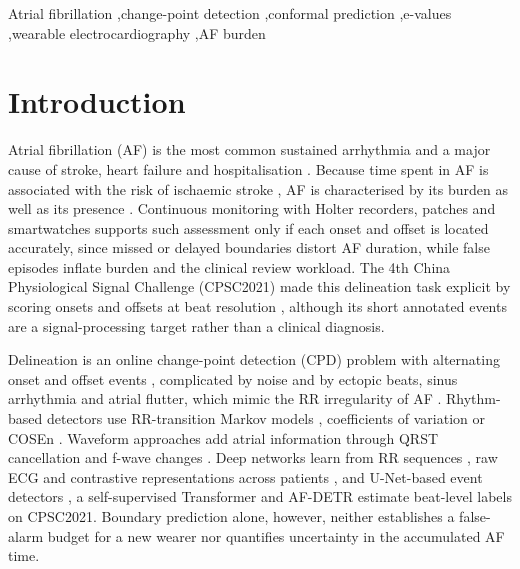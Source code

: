 \documentclass[preprint,12pt]{elsarticle}
\newcommand{\1}{\mathbf{1}}
\begin{document}
\begin{frontmatter}
\begin{keyword}
Atrial fibrillation \sep change-point detection \sep conformal prediction \sep e-values \sep wearable electrocardiography \sep AF burden
\end{keyword}

\end{frontmatter}

\section{Introduction}
\label{sec:intro}

Atrial fibrillation (AF) is the most common sustained arrhythmia and a major cause of stroke, heart failure and hospitalisation \cite{vangelder2024esc}. Because time spent in AF is associated with the risk of ischaemic stroke \cite{becher2024burden}, AF is characterised by its burden as well as its presence \cite{becher2024burden,vangelder2024esc}. Continuous monitoring with Holter recorders, patches and smartwatches \cite{mannhart2023basel,aguilar2025smartwatch} supports such assessment only if each onset and offset is located accurately, since missed or delayed boundaries distort AF duration, while false episodes inflate burden and the clinical review workload. The 4th China Physiological Signal Challenge (CPSC2021) made this delineation task explicit by scoring onsets and offsets at beat resolution \cite{cpsc2021}, although its short annotated events are a signal-processing target rather than a clinical diagnosis.

Delineation is an online change-point detection (CPD) problem with alternating onset and offset events \cite{gupta2024review}, complicated by noise and by ectopic beats, sinus arrhythmia and atrial flutter, which mimic the RR irregularity of AF \cite{cpsc2021}. Rhythm-based detectors use RR-transition Markov models \cite{moody1983afdb,kalidas2019markov}, coefficients of variation \cite{tateno2001} or COSEn \cite{lake2011cosen}. Waveform approaches add atrial information through QRST cancellation \cite{stridh2001qrst} and f-wave changes \cite{petrutiu2007ltafdb}. Deep networks learn from RR sequences \cite{faust2018}, raw ECG \cite{salvi2024aiaf} and contrastive representations across patients \cite{kiyasseh2021clocs}, and U-Net-based event detectors \cite{wen2022paf}, a self-supervised Transformer \cite{yun2024safer} and AF-DETR \cite{wang2025afdetr} estimate beat-level labels on CPSC2021. Boundary prediction alone, however, neither establishes a false-alarm budget for a new wearer nor quantifies uncertainty in the accumulated AF time.
\end{document}

